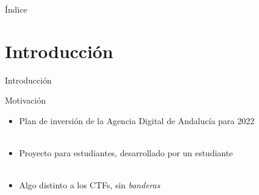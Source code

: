 \begin{frame}
    \titlepage
\end{frame}

\begin{frame}{Índice}
    \tableofcontents
\end{frame}


\section{Introducción}

    \begin{frame}
        \Huge{\centerline{Introducción}}
    \end{frame}

    \begin{frame}{Motivación}
        \begin{itemize}
            \item Plan de inversión de la Agencia Digital de Andalucía para 2022
            \\~\\
            \item Proyecto para estudiantes, desarrollado por un estudiante
            \\~\\
            \item Algo distinto a los CTFs, sin \textit{banderas}
        \end{itemize}
    \end{frame}

